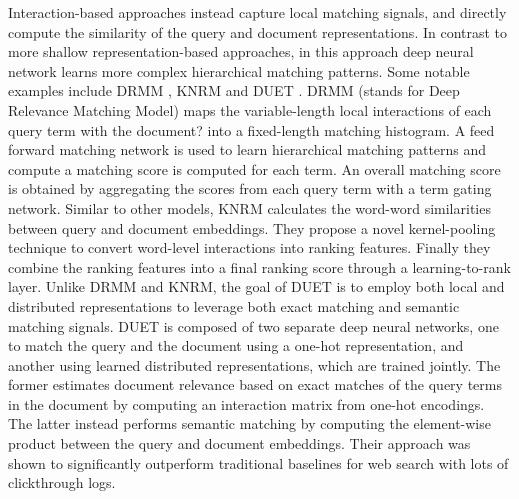Interaction-based approaches instead capture local matching signals, and directly compute the similarity of the query and document representations.
In contrast to more shallow representation-based approaches, in this approach deep neural network learns more complex hierarchical matching patterns.
Some notable examples include DRMM \cite{guo2017drmm}, KNRM \cite{xiong2017knrm} and DUET \cite{mitra2017neural}.
DRMM (stands for Deep Relevance Matching Model) \cite{guo2017drmm} maps the variable-length local interactions of each query term with the document? into a fixed-length matching histogram.
A feed forward matching network is used to learn hierarchical matching patterns and compute a matching score is computed for each term.
An overall matching score is obtained by aggregating the scores from each query term with a term gating network.
Similar to other models, KNRM \cite{xiong2017knrm} calculates the word-word similarities between query and document embeddings.
They propose a novel kernel-pooling technique to convert word-level interactions into ranking features.
Finally they combine the ranking features into a final ranking score through a learning-to-rank layer.
Unlike DRMM and KNRM, the goal of DUET \cite{mitra2017neural} is to employ both local and distributed representations to leverage both exact matching and semantic matching signals.
DUET is composed of two separate deep neural networks, one to match the query and the document using a one-hot representation, and another using learned distributed representations, which are trained jointly.
The former estimates document relevance based on exact matches of the query terms in the document by computing an interaction matrix from one-hot encodings.
The latter instead performs semantic matching by computing the element-wise product between the query and document embeddings.
Their approach was shown to significantly outperform traditional baselines for web search with lots of clickthrough logs.

